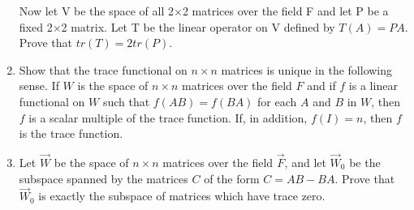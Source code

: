 \begin{enumerate}[label=\thesubsection.\arabic*.,ref=\thesubsection.\theenumi]
Now let V be the space of all 2$\times$2 matrices over the field F and let P be a fixed 2$\times$2 matrix. Let T be the linear operator on V defined by $T(A)=PA$. Prove that $tr(T)=2tr(P)$. 
%
\\
\solution

\item Show that the trace functional on $n\times n$ matrices is unique in the following sense. If $W$ is the space of $n \times n$ matrices over the field $F$ and if $f$ is a linear functional on $W$ such that $f(AB) = f(BA)$ for each $A$ and $B$ in $W$, then $f$ is a scalar multiple of the trace function. If, in addition, $f(I)=n$, then $f$ is the trace function.
\\
\solution

\item Let $\vec{W}$ be the space of $n\times n$ matrices over the field $\vec{F}$, and let $\vec{W}_0$ be 
the subspace spanned by the matrices $C$ of the form $C=AB-BA$. Prove that $\vec{W}_0$ is exactly the
subspace of matrices which have trace zero.
%
\\
\solution

\end{enumerate}
